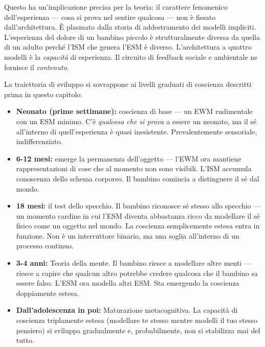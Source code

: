 \documentclass[11pt, twoside, openright]{book}
\begin{document}
Questo ha un'implicazione precisa per la teoria: il carattere fenomenico dell'esperienza --- cosa si prova nel sentire qualcosa --- non è fissato dall'architettura. È plasmato dalla storia di addestramento dei modelli impliciti. L'esperienza del dolore di un bambino piccolo è strutturalmente diversa da quella di un adulto perché l'ISM che genera l'ESM è diverso. L'architettura a quattro modelli è la \textit{capacità} di esperienza. Il circuito di feedback sociale e ambientale ne fornisce il \textit{contenuto}.

La traiettoria di sviluppo si sovrappone ai livelli graduati di coscienza descritti prima in questo capitolo:

\begin{itemize}
  \item \textbf{Neonato (prime settimane):} coscienza di base --- un EWM rudimentale con un ESM minimo. C'è \textit{qualcosa che si prova} a essere un neonato, ma il sé all'interno di quell'esperienza è quasi inesistente. Prevalentemente sensoriale, indifferenziato.
\end{itemize}

\begin{itemize}
  \item \textbf{6-12 mesi:} emerge la permanenza dell'oggetto --- l'EWM ora mantiene rappresentazioni di cose che al momento non sono visibili. L'ISM accumula conoscenza dello schema corporeo. Il bambino comincia a distinguere il sé dal mondo.
\end{itemize}

\begin{itemize}
  \item \textbf{18 mesi:} il test dello specchio. Il bambino riconosce sé stesso allo specchio --- un momento cardine in cui l'ESM diventa abbastanza ricco da modellare il sé fisico come un oggetto nel mondo. La coscienza semplicemente estesa entra in funzione. Non è un interruttore binario, ma una soglia all'interno di un processo continuo.
\end{itemize}

\begin{itemize}
  \item \textbf{3-4 anni:} Teoria della mente. Il bambino riesce a modellare altre menti --- riesce a capire che qualcun altro potrebbe credere qualcosa che il bambino sa essere falso. L'ESM ora modella altri ESM. Sta emergendo la coscienza doppiamente estesa.
\end{itemize}

\begin{itemize}
  \item \textbf{Dall'adolescenza in poi:} Maturazione metacognitiva. La capacità di coscienza triplamente estesa (modellare te stesso mentre modelli il tuo stesso pensiero) si sviluppa gradualmente e, probabilmente, non si stabilizza mai del tutto.
\end{itemize}
\end{document}
